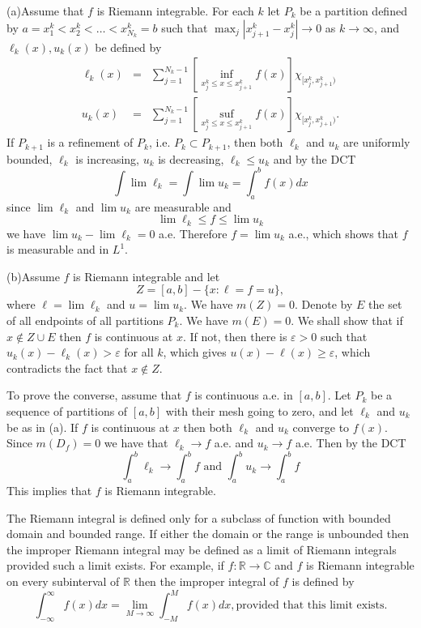 \documentclass[12pt]{report}
\newcommand{\twostack}[2]{\mathrel{\mathop{#1}\limits_{#2}}}
\begin{document}
\medskip
{} (a)\quad Assume that $f$ is Riemann integrable. 
For each $k$ let 
$P_k$ be a partition defined by $a = x^k_1 < x^k_2 < \dots < x^k_{N_k} =
b$ such that
$\max_j |x^k_{j+1} - x^k_j| \longrightarrow 0$ as $k \to \infty$, and
$\ell_k (x), u_k (x)$ be defined by
\begin{eqnarray*}
\ell_k (x) &=& \sum^{N_k -1}_{j=1} \left [ \twostack{\inf}{x_j^k \le x \le
x^k_{j+1}} f(x)\right ]
\chi_{[x^k_j, x^k_{j+1})}\\ u_k(x) &=& \sum^{N_k-1}_{j=1} \left
[\twostack{\mbox{suf}}{x^k_j \le x \le x^k_{j+1}} f(x)
\right ]
\chi_{[x^k_j, x^k_{j+1})}.
\end{eqnarray*} If $P_{k+1}$ is a refinement of $P_k$, i.e. $P_k \subset
P_{k+1}$,  then both $\ell_k$ and $u_k $ are uniformly bounded, $\ell_k$
is increasing, $u_k$ is decreasing,
$\ell_k \le u_k$ and by the DCT
\[
\int \lim \ell_k= \int \lim u_k = \int^b_a f(x) dx
\] since $\lim \ell_k$ and $\lim u_k$ are measurable and 
\[
\lim \ell_k \le f \le \lim u_k
\] we have $\lim u_k - \lim \ell_k = 0$ a.e.  Therefore $f = \lim u_k$ a.e.,
which shows that $f$ is measurable and in $L^1$.

 \medskip
\noindent (b)\quad  Assume $f$ is Riemann integrable and let
\[ Z = [a,b] - \{x: \ell = f = u\},
\] where $\ell = \lim \ell_k$ and $u = \lim u_k$.  We have $m(Z) = 0$.  
Denote by $E$ the set of all endpoints of all partitions $P_k$.  We have
$m(E) = 0$.  We shall show that if $x \notin Z \cup E$ then  $f$ is
continuous at $x$.  If not, then there is
$\varepsilon > 0$ such that $u_k (x) - \ell_k(x) > \varepsilon$ for all
$k$, which gives $u(x) - \ell (x) \ge \varepsilon$, which contradicts the
fact that $x \notin Z$.


To prove the converse, assume that $f$ is continuous a.e. in $[a,b]$.  Let
$P_k$ be a sequence of partitions of $[a,b]$ with their mesh going to
zero, and let $\ell_k$ and
$u_k$ be as in (a).  If $f$ is continuous at $x$ then both $\ell_k$ and 
$u_k$ converge to $f(x)$.  Since $m(D_f) = 0$ we have that $\ell_k
\longrightarrow f$ a.e. and $u_k \longrightarrow f$ a.e.  Then by the DCT
\[
\int^b_a \ell_k \longrightarrow \int^b_a f \mbox{ and } \int^b_a u_k
\longrightarrow \int^b_a f
\] This implies that $f$ is Riemann integrable.

\bigskip
{} The Riemann integral is defined only for a subclass
of function with bounded domain and bounded range.  If either the
domain or the range is unbounded then the improper Riemann integral
may be defined as a limit of Riemann integrals provided such a limit
exists.  For example, if $f: \mathbb{R} \longrightarrow
\mathbb{C}$ and  $f$ is Riemann integrable on every subinterval of
$\mathbb{R}$ then the improper integral of $f$ is defined by
\[
\int^\infty_{- \infty} f(x) dx = \lim_{M \to \infty} \int^M_{-M} f (x)  dx,
\mbox{provided that this limit exists.}
\]
\end{document}
